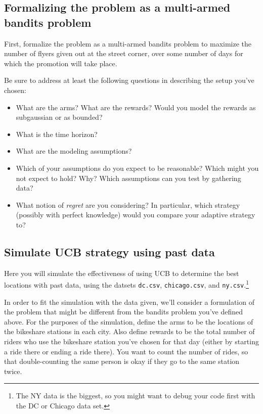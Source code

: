 \documentclass[12pt, answers, addpoints]{exam}
\begin{document}
\subsection{Formalizing the problem as a multi-armed bandits problem}
\label{sec:bandit_formulation}
First, formalize the problem as a multi-armed bandits problem to maximize the number of flyers given out at the street corner, over some number of days for which the promotion will take place.

Be sure to address at least the following questions in describing the setup you've chosen:
\begin{itemize}
    \item What are the arms? What are the rewards? Would you model the rewards as subgaussian or as bounded?
    \item What is the time horizon?
    \item What are the modeling assumptions? 
    \item Which of your assumptions do you expect to be reasonable? Which might you not expect to hold? Why? Which assumptions can you test by gathering data?
    \item What notion of \emph{regret} are you considering? In particular, which strategy (possibly with perfect knowledge) would you compare your adaptive strategy to?
\end{itemize}

\subsection{Simulate UCB strategy using past data}
Here you will simulate the effectiveness of using UCB to determine the best locations with past data, using the datsets \texttt{dc.csv}, \texttt{chicago.csv}, and \texttt{ny.csv}.\footnote{The NY data is the biggest, so you might want to debug your code first with the DC or Chicago data set.}

In order to fit the simulation with the data given, we'll consider a formulation of the problem that might be different from the bandits problem you've defined above. For the purposes of the simulation, define the arms to be the locations of the bikeshare stations in each city. Also define rewards to be the total number of riders who use the bikeshare station you've chosen for that day (either by starting a ride there or ending a ride there). You want to count the number of rides, so that double-counting the same person is okay if they go to the same station twice.    
\end{document}

